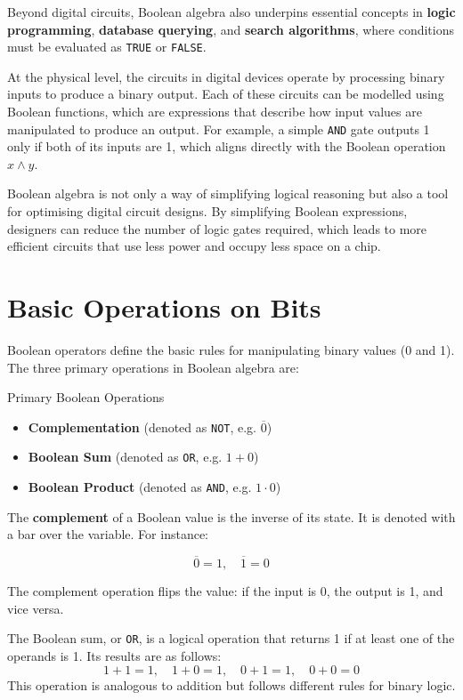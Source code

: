 Beyond digital circuits, Boolean algebra also underpins essential concepts in \textbf{logic programming}, \textbf{database querying}, and \textbf{search algorithms}, where conditions must be evaluated as \texttt{TRUE} or \texttt{FALSE}.

At the physical level, the circuits in digital devices operate by processing binary inputs to produce a binary output. Each of these circuits can be modelled using Boolean functions, which are expressions that describe how input values are manipulated to produce an output. For example, a simple \texttt{AND} gate outputs 1 only if both of its inputs are 1, which aligns directly with the Boolean operation \( x \land y \).

Boolean algebra is not only a way of simplifying logical reasoning but also a tool for optimising digital circuit designs. By simplifying Boolean expressions, designers can reduce the number of logic gates required, which leads to more efficient circuits that use less power and occupy less space on a chip.

\section{Basic Operations on Bits}
Boolean operators define the basic rules for manipulating binary values (0 and 1). The three primary operations in Boolean algebra are:

\begin{custombox}{Primary Boolean Operations}
    

\begin{itemize}
    \item \textbf{Complementation} (denoted as \texttt{NOT}, e.g. $\overline{0}$)
    \item \textbf{Boolean Sum} (denoted as \texttt{OR}, e.g. $1 + 0$)
    \item \textbf{Boolean Product} (denoted as \texttt{AND}, e.g. $1 \cdot 0$)
\end{itemize}
\end{custombox}

The \textbf{complement} of a Boolean value is the inverse of its state. It is denoted with a bar over the variable. For instance:

\[
\overline{0} = 1, \quad \overline{1} = 0
\]

The complement operation flips the value: if the input is 0, the output is 1, and vice versa.

The Boolean sum, or \texttt{OR}, is a logical operation that returns 1 if at least one of the operands is 1. Its results are as follows:
\[
1 + 1 = 1, \quad 1 + 0 = 1, \quad 0 + 1 = 1, \quad 0 + 0 = 0
\]
This operation is analogous to addition but follows different rules for binary logic.

